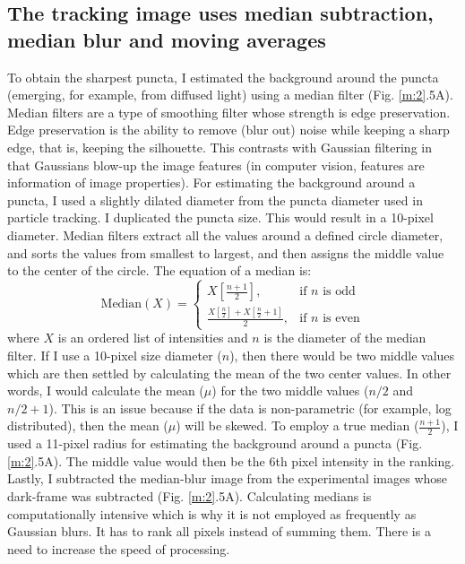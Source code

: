\subsection{The tracking image uses median subtraction, median blur and moving averages}
To obtain the sharpest puncta, I estimated the background around the puncta (emerging, for example, from diffused light) using a median filter (Fig. \ref{m:2}.5A). Median filters are a type of smoothing filter whose strength is edge preservation. Edge preservation is the ability to remove (blur out) noise while keeping a sharp edge, that is, keeping the silhouette. This contrasts with Gaussian filtering in that Gaussians blow-up the image features (in computer vision, features are information of image properties). For estimating the background around a puncta, I used a slightly dilated diameter from the puncta diameter used in particle tracking. I duplicated the puncta size. This would result in a 10-pixel diameter. Median filters extract all the values around a defined circle diameter, and sorts the values from smallest to largest, and then assigns the middle value to the center of the circle. The equation of a median is:
\begin{equation}
\text{Median}(X) = 
\left\{\begin{array}{lr}
X[\frac{n+1}{2}], & \text{if }n \text{ is odd}\\
\frac{X[\frac{n}{2}]+X[\frac{n}{2}+1]}{2},& \text{if }n \text{ is even}
\end{array}\right.
\end{equation} where $X$ is an ordered list of intensities and $n$ is the diameter of the median filter. If I use a 10-pixel size diameter ($n$), then there would be two middle values which are then settled by calculating the mean of the two center values. In other words, I would calculate the mean ($\mu$) for the two middle values ($n/2$ and $n/2+1$). This is an issue because if the data is non-parametric (for example, log distributed), then the mean ($\mu$) will be skewed. To employ a true median ($\frac{n+1}{2}$), I used a 11-pixel radius for estimating the background around a puncta (Fig. \ref{m:2}.5A). The middle value would then be the 6th pixel intensity in the ranking. Lastly, I subtracted the median-blur image from the experimental images whose dark-frame was subtracted (Fig. \ref{m:2}.5A). Calculating medians is computationally intensive which is why it is not employed as frequently as Gaussian blurs. It has to rank all pixels instead of summing them. There is a need to increase the speed of processing.

